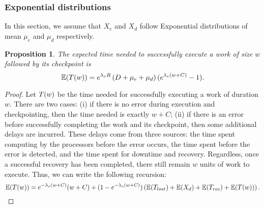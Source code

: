 \documentclass[10pt,table]{article}
\newtheorem{proposition}{Proposition}
\newcommand{\ema}[1]{\ensuremath{#1}\xspace}
\newcommand{\E}{\mathbb{E}}
\newcommand{\Xlost}{\ema{T_{lost}}}
\newcommand{\Xrec}{\ema{T_{rec}}}
\newcommand{\www}{\ema{w}}
\newcommand{\lambdae}{\ema{\lambda_{e}}}
\newcommand{\mue}{\ema{\mu_{e}}}
\newcommand{\mud}{\ema{\mu_{d}}}
\newcommand{\ccc}{\ema{C}}
\newcommand{\rrr}{\ema{R}}
\newcommand{\ddd}{\ema{D}}
\begin{document}
\subsubsection{Exponential distributions}
\label{sec.sub.exp}

In this section, we assume that $X_{e}$ and $X_{d}$ follow Exponential distributions of mean \mue and \mud respectively.

\begin{proposition}
\label{th.work}
The expected time needed to successfully execute a work of size \www followed by its checkpoint is
$$\E(\T(\www))= e^{\lambdae \rrr} \left(\ddd + \mue + \mud \right) (e^{\lambdae(\www + \ccc)} -1 ).$$
\end{proposition}

\begin{proof}
Let $\T(\www)$ be the time needed for successfully executing a work of duration $\www$.
There are two cases: (i) if there is no error during execution and checkpointing, then the time needed is
exactly $\www+ \ccc$; (ii) if there is an error before successfully completing  the work and its checkpoint, then some additional delays 
are incurred. These delays come from three sources: the time spent
computing by the processors before the error occurs,  the time spent before the error is detected, and the time spent for downtime and recovery. 
Regardless, once a successful recovery has been completed,
 there still remain $\www$ units of work to execute. 
Thus, we can write the following recursion: \\
\begin{equation}
  \E(\T(\www)) = e^{-  \lambdae (\www + \ccc)} (\www+ \ccc)
  + (1-e^{- \lambdae (\www + \ccc)} ) \left( \E(\Xlost)+ \E(X_{d})+\E(\Xrec) +\E(\T(\www)) \right) .
  \label{eq.dq0}
\end{equation}


\end{proof}
\end{document}

